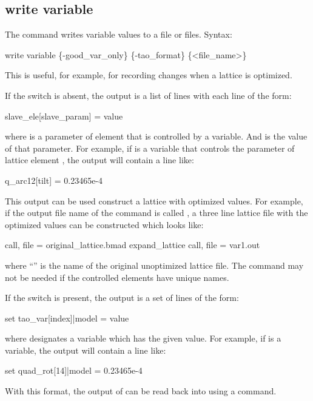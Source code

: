 {{{{{{{{{%

\subsection{write variable}
\label{s:write.variable}

The  command writes \tao variable values to a file or files.
Syntax:
\begin{example}
    write variable \{-good_var_only\} \{-tao_format\} \{<file_name>\} 
\end{example}
This is useful, for example, for recording changes when a lattice is optimized.

If the  switch is absent, the output is a list of lines with each line of the form:
\begin{example}
  slave_ele[slave_param] = value
\end{example}
where  is a parameter of \bmad element  that is controlled by a \tao
variable. And  is the value of that parameter. For example, if  is a \tao
variable that controls the  parameter of \bmad lattice element , the output
will contain a line like:
\begin{example}
  q_arc12[tilt] = 0.23465e-4
\end{example}
This output can be used construct a lattice with optimized values. For example, if the output file
name of the  command is called , a three line lattice file with the
optimized values can be constructed which looks like:
\begin{example}
  call, file = original_lattice.bmad
  expand_lattice
  call, file = var1.out
\end{example}
where ``'' is the name of the original unoptimized lattice file. The
 command may not be needed if the controlled \bmad elements have unique names.

If the  switch is present, the output is a set of lines of the form:
\begin{example}
  set tao_var[index]|model = value
\end{example}
where  designates a \tao variable which has the given  value. For
example, if  is a \tao variable, the output
will contain a line like:
\begin{example}
  set quad_rot[14]|model = 0.23465e-4
\end{example}
With this format, the output of  can be read back into \tao using a 
command.

}}}}}}}}}
